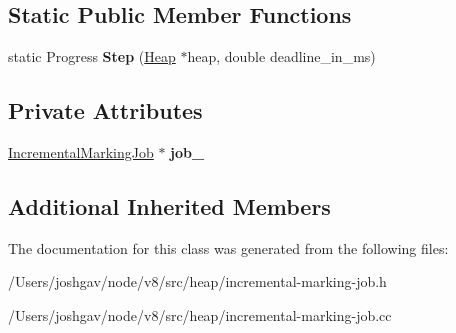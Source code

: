 \subsection*{Static Public Member Functions}
\begin{DoxyCompactItemize}
\item 
static Progress {\bfseries Step} (\hyperlink{classv8_1_1internal_1_1_heap}{Heap} $\ast$heap, double deadline\+\_\+in\+\_\+ms)\hypertarget{classv8_1_1internal_1_1_incremental_marking_job_1_1_idle_task_a9e74173763e06f72acc76c98347968e9}{}\label{classv8_1_1internal_1_1_incremental_marking_job_1_1_idle_task_a9e74173763e06f72acc76c98347968e9}

\end{DoxyCompactItemize}
\subsection*{Private Attributes}
\begin{DoxyCompactItemize}
\item 
\hyperlink{classv8_1_1internal_1_1_incremental_marking_job}{Incremental\+Marking\+Job} $\ast$ {\bfseries job\+\_\+}\hypertarget{classv8_1_1internal_1_1_incremental_marking_job_1_1_idle_task_ad082ad36c2ba0b18d5379fac07fcce0e}{}\label{classv8_1_1internal_1_1_incremental_marking_job_1_1_idle_task_ad082ad36c2ba0b18d5379fac07fcce0e}

\end{DoxyCompactItemize}
\subsection*{Additional Inherited Members}


The documentation for this class was generated from the following files\+:\begin{DoxyCompactItemize}
\item 
/\+Users/joshgav/node/v8/src/heap/incremental-\/marking-\/job.\+h\item 
/\+Users/joshgav/node/v8/src/heap/incremental-\/marking-\/job.\+cc\end{DoxyCompactItemize}
